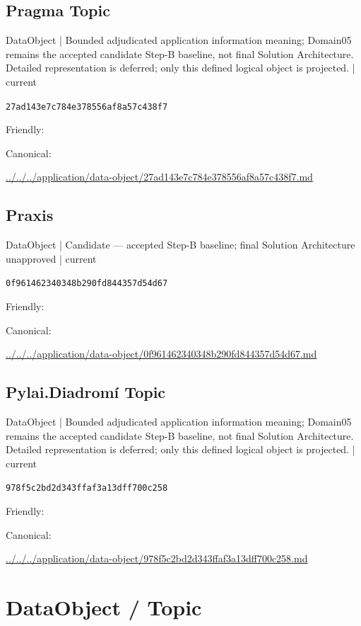 \documentclass[10pt,a4paper]{article}
\begin{document}
\subsection*{Pragma Topic}
{\small DataObject | Bounded adjudicated application information meaning; Domain05 remains the accepted candidate Step-B baseline, not final Solution Architecture. Detailed representation is deferred; only this defined logical object is projected. | current}\par
\texttt{27ad143e7c784e378556af8a57c438f7}\par
Friendly: \par
Canonical: \par
{\footnotesize\url{../../../application/data-object/27ad143e7c784e378556af8a57c438f7.md}}\par
\subsection*{Praxis}
{\small DataObject | Candidate — accepted Step-B baseline; final Solution Architecture unapproved | current}\par
\texttt{0f961462340348b290fd844357d54d67}\par
Friendly: \par
Canonical: \par
{\footnotesize\url{../../../application/data-object/0f961462340348b290fd844357d54d67.md}}\par
\subsection*{Pylai.Diadromí Topic}
{\small DataObject | Bounded adjudicated application information meaning; Domain05 remains the accepted candidate Step-B baseline, not final Solution Architecture. Detailed representation is deferred; only this defined logical object is projected. | current}\par
\texttt{978f5c2bd2d343ffaf3a13dff700c258}\par
Friendly: \par
Canonical: \par
{\footnotesize\url{../../../application/data-object/978f5c2bd2d343ffaf3a13dff700c258.md}}\par
\section*{DataObject / Topic}
\end{document}
